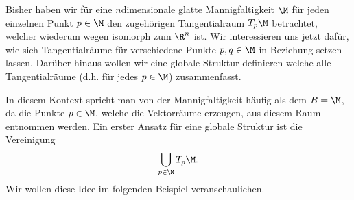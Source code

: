 \documentclass[letterpaper,10pt,english]{jupyterBook}
\begin{document}
\sphinxAtStartPar
Bisher haben wir für eine \(n\)\sphinxhyphen{}dimensionale glatte Mannigfaltigkeit \(\M\) für jeden einzelnen Punkt \(p\in\M\) den zugehörigen Tangentialraum \(T_p\M\) betrachtet, welcher wiederum wegen {\hyperref[\detokenize{manifolds/tangential:thm:tanbasis}]{}} isomorph zum \(\R^n\) ist.
Wir interessieren uns jetzt dafür, wie sich Tangentialräume für verschiedene Punkte \(p,q\in \M\) in Beziehung setzen lassen.
Darüber hinaus wollen wir eine globale Struktur definieren welche alle Tangentialräume (d.h. für jedes \(p\in\M\)) zusammenfasst.

\sphinxAtStartPar
In diesem Kontext spricht man von der Mannigfaltigkeit häufig als dem  \(B=\M\), da die Punkte \(p \in \M\), welche die Vektorräume erzeugen, aus diesem Raum entnommen werden.
Ein erster Ansatz für eine globale Struktur ist die Vereinigung
\begin{equation*}
\begin{split}\bigcup_{p\in\M} T_p\M.\end{split}
\end{equation*}
\sphinxAtStartPar
Wir wollen diese Idee im folgenden Beispiel veranschaulichen.
\label{manifolds/tangential:ex:tangentialS1}
\end{document}
